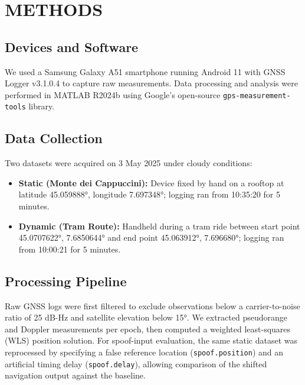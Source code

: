 
\section{METHODS} \label{sec:methods}


    \subsection{Devices and Software}
    
      We used a Samsung Galaxy A51 smartphone running Android 11 with GNSS Logger v3.1.0.4 to capture raw measurements. 
      Data processing and analysis were performed in MATLAB R2024b using Google's open-source \texttt{gps-measurement-tools} library.
    
      \vspace{-0.2cm}

    \subsection{Data Collection}
    
      Two datasets were acquired on 3 May 2025 under cloudy conditions:

      \begin{itemize}
        \item \textbf{Static (Monte dei Cappuccini):} Device fixed by hand on a rooftop at latitude 45.059888°, longitude 7.697348°; logging ran from 10:35:20 for 5 minutes.
        \item \textbf{Dynamic (Tram Route):} Handheld during a tram ride between start point 45.0707622°, 7.6850644° and end point 45.063912°, 7.696680°; logging ran from 10:00:21 for 5 minutes.
      \end{itemize}

      \vspace{-0.2cm}

    \subsection{Processing Pipeline}
    
      Raw GNSS logs were first filtered to exclude observations below a carrier-to-noise ratio of 25 dB-Hz and satellite elevation below 15°. 
      We extracted pseudorange and Doppler measurements per epoch, then computed a weighted least-squares (WLS) position solution. 
      For spoof-input evaluation, the same static dataset was reprocessed by specifying a false reference location (\texttt{spoof.position}) and an artificial timing delay (\texttt{spoof.delay}), allowing comparison of the shifted navigation output against the baseline.
